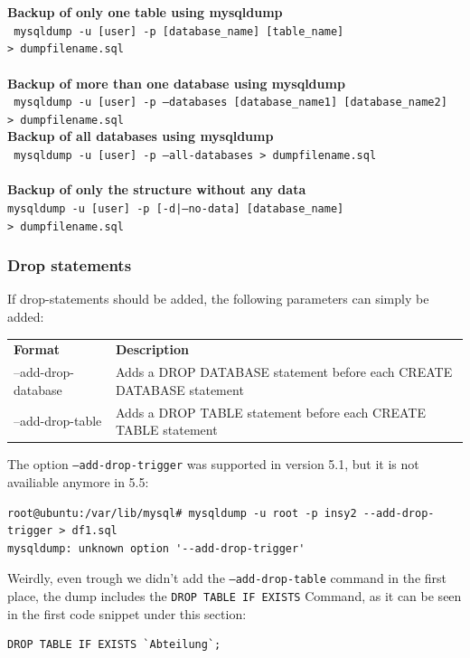 \documentclass[10pt]{article}
\begin{document}
\textbf{Backup of only one table using mysqldump}\\
\texttt{ mysqldump -u  [user] -p [database\_name] [table\_name] \textgreater ~dumpfilename.sql } \\ \\
\textbf{Backup of more than one database using mysqldump}\\
\texttt{ mysqldump -u  [user] -p --databases [database\_name1] [database\_name2] \textgreater ~dumpfilename.sql } \\ 
\textbf{Backup of all databases using mysqldump}\\
\texttt{ mysqldump -u  [user] -p --all-databases \textgreater ~dumpfilename.sql } \\ \\
\textbf{Backup of only the structure without any data}\\
\texttt{mysqldump -u  [user] -p [-d|--no-data] [database\_name] \textgreater ~dumpfilename.sql }
\subsubsection{Drop statements}
If drop-statements should be added, the following parameters can simply be added:
\begin{table}[h]
\begin{tabular}{ll}
\textbf{Format}     & \textbf{Description}                                                \\
--add-drop-database & Adds a DROP DATABASE statement before each CREATE DATABASE statement \\
--add-drop-table    & Adds a DROP TABLE statement before each CREATE TABLE statement       \\
\end{tabular}
\end{table} \cite{mysqldumpman}
\FloatBarrier
The option \texttt{--add-drop-trigger} was supported in version 5.1, but it is not availiable anymore in 5.5:  
\begin{lstlisting}    
root@ubuntu:/var/lib/mysql# mysqldump -u root -p insy2 --add-drop-trigger > df1.sql
mysqldump: unknown option '--add-drop-trigger' 
\end{lstlisting}    
Weirdly, even trough we didn't add the \texttt{--add-drop-table} command in the first place, the dump includes the 
\texttt{DROP TABLE IF EXISTS} Command, as it can be seen in the first code snippet under this section:
\begin{lstlisting}    
DROP TABLE IF EXISTS `Abteilung`;
\end{lstlisting}    
\end{document}

